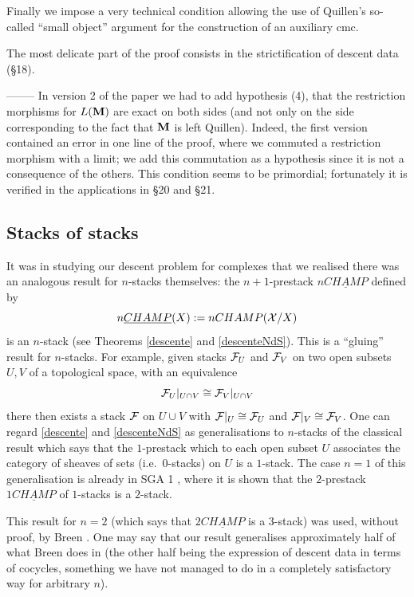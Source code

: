 Finally we impose a very technical condition allowing the use of Quillen's
so-called ``small object'' argument for the construction of an auxiliary cmc.

The most delicate part of the proof consists in the strictification of
descent data (\S18).

\noindent
--------
\newline
In version 2 of the paper we had to add hypothesis (4), that the restriction
morphisms for $L({\bf M} )$ are exact on both sides (and not only on the side
corresponding to the fact that ${\bf M}$ is left Quillen). Indeed, the first
version contained an error in one line of the proof, where we commuted a
restriction morphism with a limit; we add this commutation as a hypothesis
since it is not a consequence of the others. This condition seems to be
primordial; fortunately it is verified in the applications in \S20 and \S21.

\subsection*{Stacks of stacks}

It was in studying our descent problem for complexes that we realised there
was an analogous result for $n$-stacks themselves: the $n+1$-prestack
$n\underline{CHAMP}$ defined by
$$
n\underline{CHAMP}(X):= nCHAMP ({\cal X} /X)
$$
is an $n$-stack (see Theorems \ref{descente} and \ref{descenteNdS}). This is a
``gluing'' result for $n$-stacks. For example, given stacks ${\cal F} _U$ and
${\cal F} _V$ on two open subsets $U,V$ of a topological space, with an
equivalence
$$
{\cal F} _U |_{U\cap V} \cong
{\cal F} _V |_{U\cap V}
$$
there then exists a stack ${\cal F} $ on $U\cup V$ with ${\cal F} |_U \cong {\cal F} _U$ and
${\cal F} |_V \cong {\cal F} _V$. One can regard \ref{descente} and \ref{descenteNdS}
as generalisations to $n$-stacks of the classical result which says that the
$1$-prestack which to each open subset $U$ associates the category of sheaves
of sets (i.e.\ $0$-stacks) on $U$ is a $1$-stack. The case $n=1$ of this
generalisation is already in SGA 1 \cite{SGA1} \cite{GiraudThese}, where it is
shown that the $2$-prestack $1\underline{CHAMP}$ of $1$-stacks is a
$2$-stack.

This result for $n=2$ (which says that $2\underline{CHAMP}$ is a $3$-stack)
was used, without proof, by Breen \cite{Breen}. One may say that our result
generalises approximately half of what Breen does in \cite{Breen} (the other
half being the expression of descent data in terms of cocycles, something we
have not managed to do in a completely satisfactory way for arbitrary $n$).

